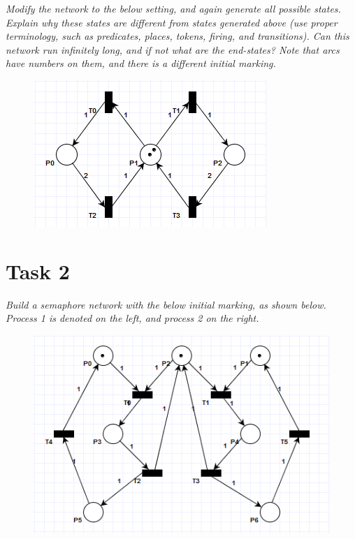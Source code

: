 \documentclass[letterpaper]{article}
\begin{document}
\textit{Modify the network to the below setting, and again generate all possible states. Explain why these states are different from states generated above (use proper terminology, such as predicates, places, tokens, firing, and transitions). Can this network run infinitely long, and if not what are the end-states?
 Note that arcs have numbers on them, and there is a different initial marking.
}

\begin{figure}[H]
 \centering
 \includegraphics[width=\textwidth]{image2.png}
\end{figure}

\section{Task 2}

\textit{Build a semaphore network with the below initial marking, as shown below. Process 1 is denoted on the left, and process 2 on the right.
}
\begin{figure}[H]
 \centering
 \includegraphics[width=\textwidth]{image3.png}
\end{figure}
\end{document}
